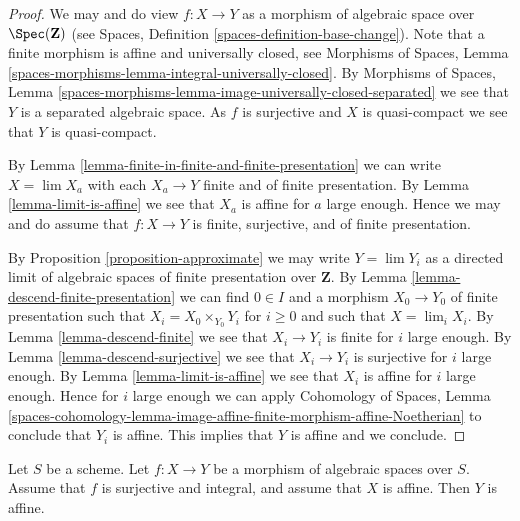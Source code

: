 \begin{proof}
We may and do view $f : X \to Y$ as a morphism of algebraic space over
$\Spec(\mathbf{Z})$ (see
Spaces, Definition \ref{spaces-definition-base-change}).
Note that a finite morphism is affine and universally closed, see
Morphisms of Spaces, Lemma
\ref{spaces-morphisms-lemma-integral-universally-closed}.
By Morphisms of Spaces, Lemma
\ref{spaces-morphisms-lemma-image-universally-closed-separated}
we see that $Y$ is a separated algebraic space.
As $f$ is surjective and $X$ is quasi-compact we see that $Y$ is
quasi-compact.

\medskip\noindent
By Lemma \ref{lemma-finite-in-finite-and-finite-presentation}
we can write $X = \lim X_a$ with each $X_a \to Y$ finite and of
finite presentation. By
Lemma \ref{lemma-limit-is-affine}
we see that $X_a$ is affine for $a$ large enough.
Hence we may and do assume that $f : X \to Y$ is finite, surjective, and
of finite presentation.

\medskip\noindent
By Proposition \ref{proposition-approximate} we may write
$Y = \lim Y_i$ as a directed limit of algebraic
spaces of finite presentation over $\mathbf{Z}$.
By Lemma \ref{lemma-descend-finite-presentation} we can
find $0 \in I$ and a morphism $X_0 \to Y_0$ of finite presentation
such that $X_i = X_0 \times_{Y_0} Y_i$ for $i \geq 0$
and such that $X = \lim_i X_i$. By
Lemma \ref{lemma-descend-finite}
we see that $X_i \to Y_i$ is finite for $i$ large enough.
By Lemma \ref{lemma-descend-surjective}
we see that $X_i \to Y_i$ is surjective for $i$ large enough.
By Lemma \ref{lemma-limit-is-affine} we see that $X_i$ is
affine for $i$ large enough. Hence for $i$ large enough we can apply
Cohomology of Spaces, Lemma
\ref{spaces-cohomology-lemma-image-affine-finite-morphism-affine-Noetherian}
to conclude that $Y_i$ is affine. This implies that $Y$ is affine and
we conclude.
\end{proof}

\begin{proposition}
\label{proposition-affine}
Let $S$ be a scheme. Let $f : X \to Y$ be a morphism of algebraic spaces
over $S$. Assume that $f$ is surjective and integral, and assume that $X$
is affine. Then $Y$ is affine.
\end{proposition}

